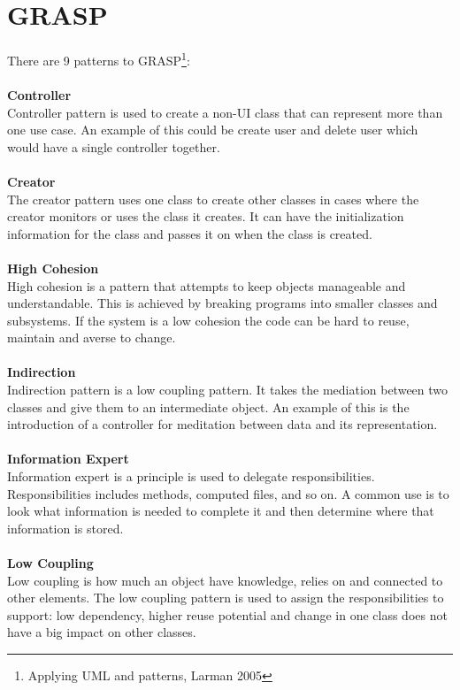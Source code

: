 \section{GRASP}
There are 9 patterns to GRASP\footnote{Applying UML and patterns, Larman 2005}:
\\
\\
\textbf{Controller}
\\
Controller pattern is used to create a non-UI class that can represent more than one use case. An example of this could be create user and delete user which would have a single controller together.
\\
\\
\textbf{Creator}
\\
The creator pattern uses one class to create other classes in cases where the creator monitors or uses the class it creates. It can have the initialization information for the class and passes it on when the class is created.
\\
\\
\textbf{High Cohesion}
\\
High cohesion is a pattern that attempts to keep objects manageable and understandable. This is achieved by breaking programs into smaller classes and subsystems. If the system is a low cohesion the code can be hard to reuse, maintain and averse to change.
\\
\\
\textbf{Indirection}
\\
Indirection pattern is a low coupling pattern. It takes the mediation between two classes and give them to an intermediate object. An example of this is the introduction of a controller for meditation between data and its representation.
\\
\\
\textbf{Information Expert}
\\
Information expert is a principle is used to delegate responsibilities. Responsibilities includes methods, computed files, and so on. A common use is to look what information is needed to complete it and then determine where that information is stored.
\\
\\
\textbf{Low Coupling}
\\
Low coupling is how much an object have knowledge, relies on and connected to other elements. The low coupling pattern is used to assign the responsibilities to support: low dependency, higher reuse potential and change in one class does not have a big impact on other classes.
